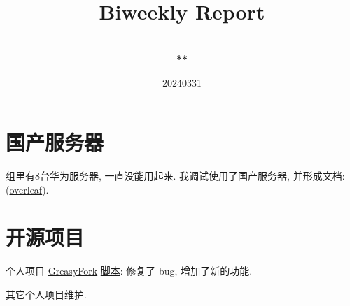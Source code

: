 \documentclass[a4paper]{article}
\title{
    \vspace*{1.0in}
     \\
    \vspace*{1in}
    \textbf{\Huge Biweekly Report}
    \vspace{0.5in}
}
\author{ \\
    \textbf{\huge ***} \\
    \vspace*{1in}
}
\date{\LARGE 20240331}
\begin{document}
\LARGE

\maketitle
\tableofcontents
\thispagestyle{empty}
\newpage

\section{国产服务器}

组里有8台华为服务器, 一直没能用起来. 我调试使用了国产服务器, 并形成文档: (\href{https://www.overleaf.com/***}{overleaf}).

\section{开源项目}

个人项目 \href{https://greasyfork.org/zh-CN/scripts/461427-%E5%9B%BD%E9%99%85%E7%BD%91%E7%AB%99-%E4%BC%AA%E8%A3%85%E6%88%90-%E5%9B%BD%E5%86%85%E7%BD%91%E7%AB%99-%E6%B1%87%E6%80%BB}{GreasyFork} \href{https://github.com/userElaina/this-is-the-China-website}{脚本}: 修复了 bug, 增加了新的功能.

其它个人项目维护.
\end{document}
